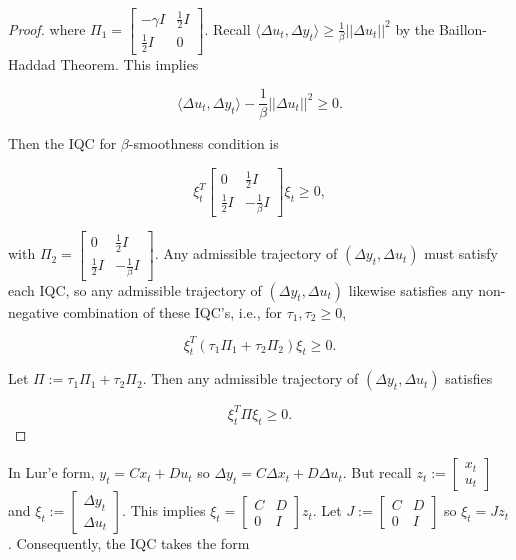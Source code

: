 \documentclass[twoside,11pt]{article}
\begin{document}
\begin{proof}
\noindent
where $\Pi_1 = \begin{bmatrix}
    -\gamma I & \frac{1}{2}I \\
    \frac{1}{2}I & 0
\end{bmatrix}$. Recall $\langle \Delta u_t, \Delta y_t \rangle \geq \frac{1}{\beta} ||\Delta u_t||^2$ by the Baillon-Haddad Theorem. This implies

\begin{equation}
\langle \Delta u_t, \Delta y_t \rangle - \frac{1}{\beta}||\Delta u_t||^2 \geq 0.
\end{equation}

\noindent
Then the IQC for $\beta$-smoothness condition is

\begin{equation}
\xi_t^T\begin{bmatrix}
    0 & \frac{1}{2}I \\
    \frac{1}{2}I & -\frac{1}{\beta}I
\end{bmatrix}\xi_t \geq 0,
\end{equation}

\noindent
with $\Pi_2 = \begin{bmatrix}
    0 & \frac{1}{2}I \\
    \frac{1}{2}I & -\frac{1}{\beta}I
\end{bmatrix}$. Any admissible trajectory of $(\Delta y_t, \Delta u_t)$ must satisfy each IQC, so any admissible trajectory of $(\Delta y_t, \Delta u_t)$ likewise satisfies any non-negative combination of these IQC's, i.e., for $\tau_1, \tau_2 \geq 0$,

\begin{equation}
\xi_t^T(\tau_1\Pi_1 + \tau_2\Pi_2)\xi_t \geq 0.
\end{equation}

\noindent
Let $\Pi := \tau_1\Pi_1 + \tau_2\Pi_2$. Then any admissible trajectory of $(\Delta y_t, \Delta u_t)$ satisfies

\begin{equation}
\xi_t^T\Pi\xi_t \geq 0.
\end{equation}
\end{proof}

\noindent
In Lur'e form, $y_t = Cx_t + Du_t$ so $\Delta y_t = C\Delta x_t + D \Delta u_t$. But recall $z_t := \begin{bmatrix}
    x_t \\
    u_t
\end{bmatrix}$ and $\xi_t := \begin{bmatrix}
    \Delta y_t \\
    \Delta u_t
\end{bmatrix}$. This implies $\xi_t = \begin{bmatrix}
    C & D \\
    0 & I
\end{bmatrix}z_t$. Let $J := \begin{bmatrix}
    C & D \\
    0 & I
\end{bmatrix}$ so $\xi_t = Jz_t$. Consequently, the IQC takes the form
\end{document}
